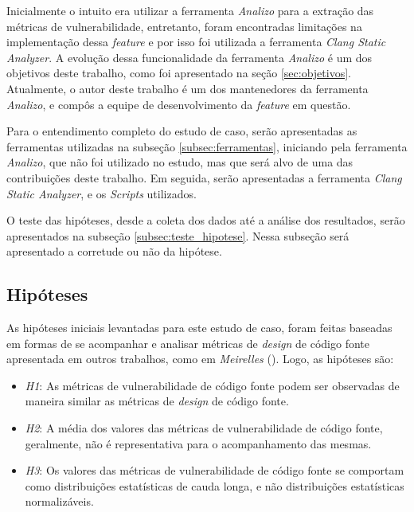 Inicialmente o intuito era utilizar a ferramenta \emph{Analizo} para a extração
das métricas de vulnerabilidade, entretanto, foram encontradas limitações na
implementação dessa \textit{feature} e por isso foi utilizada a ferramenta
\emph{Clang Static Analyzer}. A evolução dessa funcionalidade da ferramenta
\emph{Analizo} é um dos objetivos deste trabalho, como foi apresentado na seção
\ref{sec:objetivos}. Atualmente, o autor deste trabalho é um dos mantenedores da
ferramenta \emph{Analizo}, e compôs a equipe de desenvolvimento da
\textit{feature} em questão.

Para o entendimento completo do estudo de caso, serão apresentadas as
ferramentas utilizadas na subseção \ref{subsec:ferramentas}, iniciando pela ferramenta \emph{Analizo}, que
não foi utilizado no estudo, mas que será alvo de uma das contribuições deste
trabalho. Em seguida, serão apresentadas a ferramenta \emph{Clang Static
Analyzer}, e os \textit{Scripts} utilizados.

O teste das hipóteses, desde a coleta dos dados até a análise dos resultados, serão
apresentados na subseção \ref{subsec:teste_hipotese}. Nessa subseção será
apresentado a corretude ou não da hipótese.

\subsection{Hipóteses} \label{subsec:hipoteses}

As hipóteses iniciais levantadas para este estudo de caso, foram feitas baseadas em
formas de se acompanhar e analisar métricas de \textit{design} de código fonte
apresentada em outros trabalhos, como em \emph{Meirelles}
(\citeyear{meirelles2013}). Logo, as hipóteses são:

\begin{itemize}
  \item \textit{H1}: As métricas de vulnerabilidade de código fonte podem ser
    observadas de maneira similar as métricas de \textit{design} de código
    fonte.
  \item \textit{H2}: A média dos valores das métricas de vulnerabilidade de
    código fonte, geralmente, não é representativa para o acompanhamento das mesmas.
  \item \textit{H3}: Os valores das métricas de vulnerabilidade de código fonte
    se comportam como distribuições estatísticas de cauda longa, e não
    distribuições estatísticas normalizáveis.
\end{itemize}

